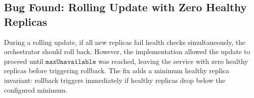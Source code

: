\subsection{Bug Found: Rolling Update with Zero Healthy Replicas}

During a rolling update, if all new replicas fail health checks simultaneously,
the orchestrator should roll back. However, the implementation allowed the
update to proceed until $\texttt{maxUnavailable}$ was reached, leaving the
service with zero healthy replicas before triggering rollback. The fix adds
a minimum healthy replica invariant: rollback triggers immediately if healthy
replicas drop below the configured minimum.

